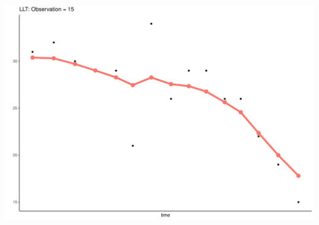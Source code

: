 \documentclass[
  ignorenonframetext,
]{beamer}
\begin{document}
\begin{frame}{}
\protect\hypertarget{section-44}{}
\includegraphics{Prez4_files/figure-beamer/unnamed-chunk-15-15.pdf}
\end{frame}
\end{document}
